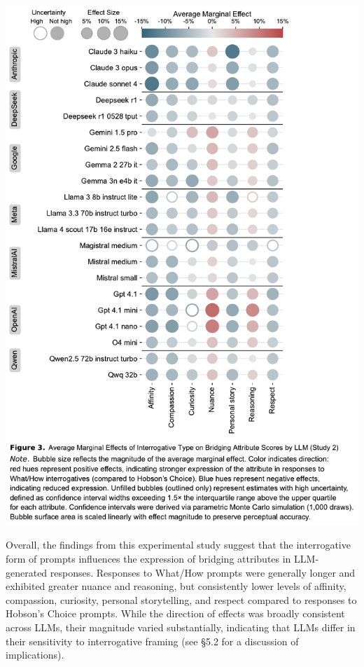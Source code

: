 \documentclass[
  12pt,
]{article}
\begin{document}
\begin{center}\includegraphics{../03_outputs/03_experimental_analyses/figure_3} \end{center}

Overall, the findings from this experimental study suggest that the interrogative form of prompts influences the expression of bridging attributes in LLM-generated responses. Responses to What/How prompts were generally longer and exhibited greater nuance and reasoning, but consistently lower levels of affinity, compassion, curiosity, personal storytelling, and respect compared to responses to Hobson's Choice prompts. While the direction of effects was broadly consistent across LLMs, their magnitude varied substantially, indicating that LLMs differ in their sensitivity to interrogative framing (see §5.2 for a discussion of implications).
\end{document}
